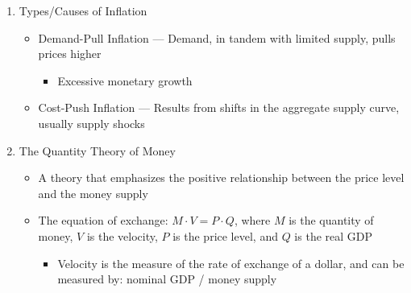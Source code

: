 \documentclass[12pt]{article}
\begin{document}
\begin{enumerate}
\begin{itemize}
    \end{itemize}

  \item Types/Causes of Inflation

    \begin{itemize}

      \item Demand-Pull Inflation — Demand, in tandem with limited supply, pulls prices higher

        \begin{itemize}

          \item Excessive monetary growth

        \end{itemize}

      \item Cost-Push Inflation — Results from shifts in the aggregate supply curve, usually supply shocks

    \end{itemize}

  \item The Quantity Theory of Money

    \begin{itemize}

      \item A theory that emphasizes the positive relationship between the price level and the money supply

      \item The equation of exchange: $M\cdot V = P\cdot Q$, where $M$ is the quantity of money, $V$ is the velocity, $P$ is the price level, and $Q$ is the real GDP

        \begin{itemize}

          \item Velocity is the measure of the rate of exchange of a dollar, and can be measured by: nominal GDP / money supply

        \end{itemize}

    \end{itemize}

\end{enumerate}
\end{document}

